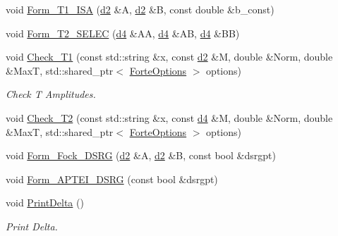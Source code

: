 \begin{DoxyCompactItemize}
\item 
void \mbox{\hyperlink{classforte_1_1_m_c_s_r_g_p_t2___m_o_a647e83e0b4444a44dea8c6b6288f6f3f}{Form\+\_\+\+T1\+\_\+\+I\+SA}} (\mbox{\hyperlink{mcsrgpt2__mo_8h_ae5de8a172a3b363a852d6d32e6d90537}{d2}} \&A, \mbox{\hyperlink{mcsrgpt2__mo_8h_ae5de8a172a3b363a852d6d32e6d90537}{d2}} \&B, const double \&b\+\_\+const)
\item 
void \mbox{\hyperlink{classforte_1_1_m_c_s_r_g_p_t2___m_o_a2f6d8ab15eff1d1a4cef504976268836}{Form\+\_\+\+T2\+\_\+\+S\+E\+L\+EC}} (\mbox{\hyperlink{mcsrgpt2__mo_8h_a0a2245afece5cd37d3b0b6a462927f69}{d4}} \&AA, \mbox{\hyperlink{mcsrgpt2__mo_8h_a0a2245afece5cd37d3b0b6a462927f69}{d4}} \&AB, \mbox{\hyperlink{mcsrgpt2__mo_8h_a0a2245afece5cd37d3b0b6a462927f69}{d4}} \&BB)
\item 
void \mbox{\hyperlink{classforte_1_1_m_c_s_r_g_p_t2___m_o_a737d2c7deb1c24d5710225709e9ea367}{Check\+\_\+\+T1}} (const std\+::string \&x, const \mbox{\hyperlink{mcsrgpt2__mo_8h_ae5de8a172a3b363a852d6d32e6d90537}{d2}} \&M, double \&Norm, double \&MaxT, std\+::shared\+\_\+ptr$<$ \mbox{\hyperlink{classforte_1_1_forte_options}{Forte\+Options}} $>$ options)
\begin{DoxyCompactList}\small\item\em Check T Amplitudes. \end{DoxyCompactList}\item 
void \mbox{\hyperlink{classforte_1_1_m_c_s_r_g_p_t2___m_o_a4c21e5482c787306d1bfc356577149ca}{Check\+\_\+\+T2}} (const std\+::string \&x, const \mbox{\hyperlink{mcsrgpt2__mo_8h_a0a2245afece5cd37d3b0b6a462927f69}{d4}} \&M, double \&Norm, double \&MaxT, std\+::shared\+\_\+ptr$<$ \mbox{\hyperlink{classforte_1_1_forte_options}{Forte\+Options}} $>$ options)
\item 
void \mbox{\hyperlink{classforte_1_1_m_c_s_r_g_p_t2___m_o_aff036d2fcafadf0978399b23f6248695}{Form\+\_\+\+Fock\+\_\+\+D\+S\+RG}} (\mbox{\hyperlink{mcsrgpt2__mo_8h_ae5de8a172a3b363a852d6d32e6d90537}{d2}} \&A, \mbox{\hyperlink{mcsrgpt2__mo_8h_ae5de8a172a3b363a852d6d32e6d90537}{d2}} \&B, const bool \&dsrgpt)
\item 
void \mbox{\hyperlink{classforte_1_1_m_c_s_r_g_p_t2___m_o_a9a21cc4d3124bf2e4f030a6232f1a179}{Form\+\_\+\+A\+P\+T\+E\+I\+\_\+\+D\+S\+RG}} (const bool \&dsrgpt)
\item 
void \mbox{\hyperlink{classforte_1_1_m_c_s_r_g_p_t2___m_o_ad4abb0ead47e9109fd12388ab3f341ff}{Print\+Delta}} ()
\begin{DoxyCompactList}\small\item\em Print Delta. \end{DoxyCompactList}\item 

\end{DoxyCompactItemize}
